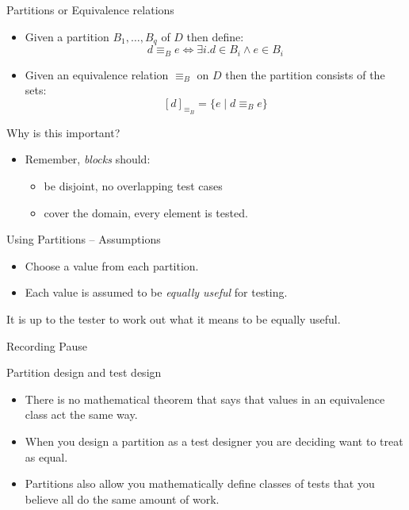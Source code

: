 \documentclass{beamer}
\newcommand{\pauseslide}{\begin{frame}{}
  \begin{center}
    Recording Pause
  \end{center}
  
\end{frame}}
\begin{document}
\begin{frame}{Partitions or Equivalence relations} 
  \begin{itemize}
  \item Given a partition $B_1,\ldots ,  B_q$ of $D$ then define:
    \[
      d \equiv_B e \Leftrightarrow \exists i. d \in B_i \land e \in B_i
    \]
  \item Given an equivalence relation $\equiv_B$ on $D$ then the
    partition consists of the sets:
    \[
    [d]_{\equiv_B} = \{ e \mid d \equiv_B e \}
    \]  
  \end{itemize}
  
\end{frame}
\begin{frame}{Why is this important?}
  \begin{itemize}
  \item Remember, {\it blocks} should: 
    \begin{itemize}
    \item be disjoint, no overlapping test cases
    \item cover the domain, every element is tested.
    \end{itemize}
  \end{itemize}  
\end{frame}
\begin{frame}{Using Partitions -- Assumptions}
  \begin{itemize}
  \item Choose a value from each partition.
  \item Each value is assumed to be {\em equally useful} for testing.
  \end{itemize}
It is up to the tester to work out what it means to be equally useful.
\end{frame}

\pauseslide

\begin{frame}{Partition design and test design}
  \begin{itemize}
  \item There is no mathematical theorem that says that values in an
    equivalence class act the same way.
  \item When you design a partition as a test designer you are
    deciding want to treat as equal.
  \item Partitions also allow you mathematically define classes of
    tests that you believe all do the same amount of work.
  \end{itemize}
\end{frame}
\end{document}
